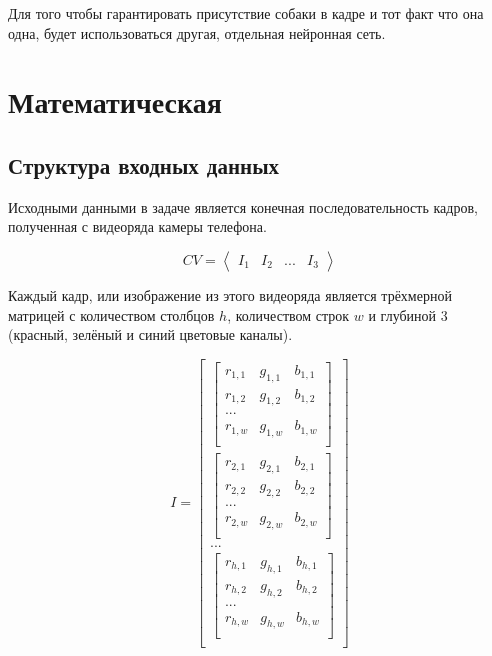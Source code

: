 Для того чтобы гарантировать присутствие собаки в кадре и тот факт что она одна, будет использоваться другая, отдельная нейронная сеть. 

\section{Математическая}\label{sect2_2}
\subsection{Структура входных данных}
Исходными данными в задаче является конечная последовательность кадров, полученная с видеоряда камеры телефона.

\begin{equation}
    CV = \left\langle
            \begin{matrix}
                I_1 & I_2 & ... & I_3
            \end{matrix}
            \right\rangle
        \end{equation}          

Каждый кадр, или изображение из этого видеоряда является трёхмерной матрицей с количеством столбцов  $h$, количеством строк $w$ и глубиной 3 (красный, зелёный и синий цветовые каналы). 

\begin{equation} 
I =    \begin{bmatrix}
            \begin{bmatrix}
            r_{1,1} & g_{1,1} & b_{1,1}\\
            r_{1,2} & g_{1,2} & b_{1,2}\\
            ...\\
            r_{1,w} & g_{1,w} & b_{1,w}\\
            \end{bmatrix}\\
            \begin{bmatrix}
            r_{2,1} & g_{2,1} & b_{2,1}\\
            r_{2,2} & g_{2,2} & b_{2,2}\\
            ...\\
            r_{2,w} & g_{2,w} & b_{2,w}\\
            \end{bmatrix}\\
            ...\\
            \begin{bmatrix}
            r_{h,1} & g_{h,1} & b_{h,1}\\
            r_{h,2} & g_{h,2} & b_{h,2}\\
            ...\\
            r_{h,w} & g_{h,w} & b_{h,w}\\
            \end{bmatrix}\\
        \end{bmatrix}
\end{equation}

